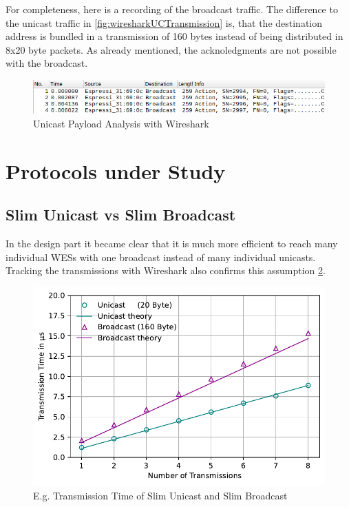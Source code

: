 For completeness, here is a recording of the broadcast traffic.
The difference to the unicast traffic in \cref{fig:wiresharkUCTransmission} is,
that the destination address is bundled in a transmission of 160 bytes instead of being distributed in 8x20 byte packets.
As already mentioned, the acknoledgments are not possible with the broadcast.

\begin{figure}[h]
	\centering
	\includegraphics[scale=0.5]{figures/wiresharkBC.png}
	\caption{Unicast Payload Analysis with Wireshark}
	\label{fig:wiresharkBCTransmission}
\end{figure}

\section{Protocols under Study}

\subsection*{Slim Unicast vs Slim Broadcast}

In the design part it became clear that it is much more efficient 
to reach many individual WESs with one broadcast instead of many individual unicasts.
Tracking the transmissions with Wireshark also confirms this assumption \cref{fig:transmissionTime}.

\begin{figure}[h]
	\centering
	\includegraphics[scale=0.6]{../Plot2/Graphs/bc_uc_transmissiontime_wireshark.pdf}
	\caption{E.g. Transmission Time of Slim Unicast and Slim Broadcast}
	\label{fig:transmissionTime}
\end{figure}

